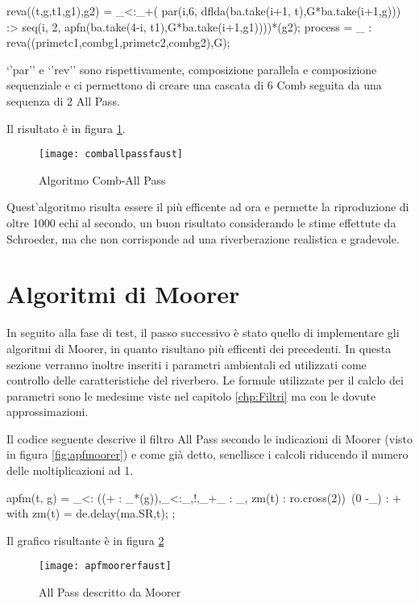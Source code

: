\begin{code}
reva((t,g,t1,g1),g2) = _<:_+(
    par(i,6, dflda(ba.take(i+1, t),G*ba.take(i+1,g))) :>
    seq(i, 2, apfn(ba.take(4-i, t1),G*ba.take(i+1,g1))))*(g2);
process = _ : reva((primetc1,combg1,primetc2,combg2),G);
\end{code}

`'par'' e `'rev'' sono rispettivamente, composizione parallela e composizione sequenziale e ci permettono di creare una cascata di 6 Comb seguita da una sequenza di 2 All Pass.

Il risultato è in figura \ref{fig:comballpassfaust}.

\begin{figure}[htp]
\centering
\texttt{[image: comballpassfaust]}
\caption{Algoritmo Comb-All Pass}
\label{fig:comballpassfaust}
\end{figure}

Quest'algoritmo risulta essere il più efficente ad ora e permette la riproduzione di oltre 1000 echi al secondo, un buon risultato considerando le stime effettute da Schroeder, ma che non corrisponde ad una riverberazione realistica e gradevole.

\section{Algoritmi di Moorer}

In seguito alla fase di test, il passo successivo è stato quello di implementare gli algoritmi di Moorer, in quanto risultano più efficenti dei precedenti.
In questa sezione verranno inoltre inseriti i parametri ambientali ed utilizzati come controllo delle caratteristiche del riverbero. Le formule utilizzate per il calclo dei parametri sono le medesime viste nel capitolo \ref{chp:Filtri} ma con le dovute approssimazioni.

\bigskip

Il codice seguente descrive il filtro All Pass secondo le indicazioni di Moorer (visto in figura \ref{fig:apfmoorer}) e come già detto, senellisce i calcoli riducendo il numero delle moltiplicazioni ad 1.

\begin{code}
apfm(t, g) = _<: ((+ : _*(g)),_<:_,!,_+_ : _, zm(t) : ro.cross(2))~(0 -_) : +
with{
    zm(t) = de.delay(ma.SR,t);
};
\end{code}

\bigskip

Il grafico risultante è in figura \ref{fig:apfmoorerfaust}

\begin{figure}[htp]
\centering
\texttt{[image: apfmoorerfaust]}
\caption{All Pass descritto da Moorer}
\label{fig:apfmoorerfaust}
\end{figure}
